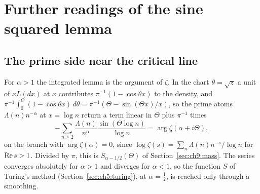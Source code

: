 \section{Further readings of the sine squared lemma}\label{ch:sin2more}
\label{sec:sin2more}

\subsection{The prime side near the critical line}\label{sec:ch10:selberg}

For $\alpha>1$ the integrated lemma is the argument of $\zeta$. In the chart $\theta=\sqrt z$ a unit of $xL(dx)$ at $x$ contributes $\pi^{-1}(1-\cos\theta x)$ to the density, and $\pi^{-1}\int_0^\Theta(1-\cos\theta x)\,d\theta=\pi^{-1}(\Theta-\sin(\Theta x)/x)$, so the prime atoms $\Lambda(n)n^{-\alpha}$ at $x=\log n$ return a term linear in $\Theta$ plus $\pi^{-1}$ times
\[
-\sum_{n\ge2}\frac{\Lambda(n)}{n^\alpha}\frac{\sin(\Theta\log n)}{\log n}=\arg\zeta(\alpha+i\Theta),
\]
on the branch with $\arg\zeta(\alpha)=0$, since $\log\zeta(s)=\sum_n\Lambda(n)n^{-s}/\log n$ for $\operatorname{Re} s>1$. Divided by $\pi$, this is $S_{\alpha-1/2}(\Theta)$ of Section~\ref{sec:ch9:mass}. The series converges absolutely for $\alpha>1$ and diverges for $\alpha<1$, so the function $S$ of Turing's method (Section~\ref{sec:ch5:turing}), at $\alpha=\tfrac12$, is reached only through a smoothing.

